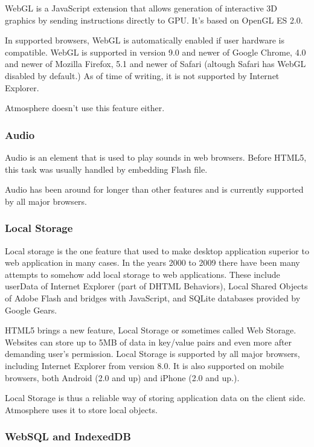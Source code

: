 WebGL is a JavaScript extension that allows generation of interactive 3D graphics by sending instructions directly to GPU. It’s based on OpenGL ES 2.0. 

In supported browsers, WebGL is automatically enabled if user hardware is compatible. WebGL is  supported in version 9.0 and newer of Google Chrome, 4.0 and newer of Mozilla Firefox, 5.1 and newer of Safari (altough Safari has WebGL disabled by default.) As of time of writing, it is not supported by Internet Explorer. 

Atmosphere doesn’t use this feature either.

\subsubsection{Audio}

Audio is an element that is used to play sounds in web browsers. Before HTML5, this task was usually handled by embedding Flash file. 

Audio has been around for longer than other features and is currently supported by all major browsers.

\subsubsection{Local Storage}

Local storage is the one feature that used to make desktop application superior to web application in many cases. In the years 2000 to 2009 there have been many attempts to somehow add local storage to web applications. These include userData of Internet Explorer (part of DHTML Behaviors), Local Shared Objects of Adobe Flash and bridges with JavaScript, and SQLite databases provided by Google Gears.

HTML5 brings a new feature, Local Storage or sometimes called Web Storage. Websites can store up to 5MB of data in key/value pairs and even more after demanding user’s permission. Local Storage is supported by all major browsers, including Internet Explorer from version 8.0. It is also supported on mobile browsers, both Android (2.0 and up) and iPhone (2.0 and up.). 

Local Storage is thus a reliable way of storing application data on the client side. Atmosphere uses it to store local objects. 

\subsubsection{WebSQL and IndexedDB}

